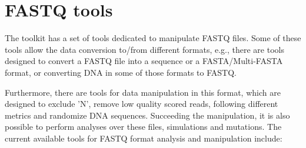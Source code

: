 \chapter{FASTQ tools}
\label{fastq}

The toolkit has a set of tools dedicated to manipulate FASTQ files. Some of these tools allow the data conversion to/from different formats, e.g., there are tools designed to convert a FASTQ file into a sequence or a FASTA/Multi-FASTA format, or converting DNA in some of those formats to FASTQ.

Furthermore, there are tools for data manipulation in this format, which are designed to exclude 'N', remove low quality scored reads, following different metrics and randomize DNA sequences. Succeeding the manipulation, it is also possible to perform analyses over these files, simulations and mutations. The current available tools for FASTQ format analysis and manipulation include:

